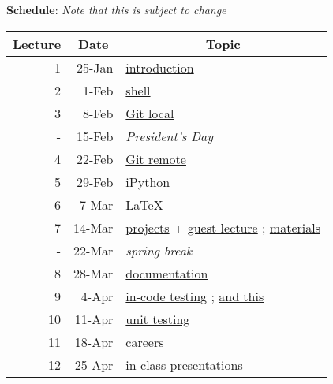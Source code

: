 \documentclass[12pt]{article}
\begin{document}
\clearpage
\noindent\textbf{Schedule}: \textit{Note that this is subject to change}\\
\begin{table}[htbp]
\begin{tabular}{|r|r|l|}
\hline
\multicolumn{1}{|c|}{Lecture} & \multicolumn{1}{c|}{Date} & \multicolumn{1}{c|}{Topic} \\ \hline
1 & 25-Jan & \href{http://rachelslaybaugh.github.io/ne24intro/#/}{introduction} \\ \hline
2 & 1-Feb & \href{https://github.com/rachelslaybaugh/shell-novice}{shell} \\ \hline
3 & 8-Feb & \href{https://github.com/rachelslaybaugh/git-novice}{Git local} \\ \hline
- & 15-Feb & \textit{President's Day} \\ \hline
4 & 22-Feb & \href{https://github.com/rachelslaybaugh/git-novice}{Git remote} \\ \hline
5 & 29-Feb & \href{https://githuhub.com/takluyver/ucb-ipython-intro.git}{iPython} \\ \hline
6 & 7-Mar & \href{https://github.com/rachelslaybaugh/NE24/tree/master/LaTeX}{\LaTeX} \\ \hline
7 & 14-Mar & \href{https://github.com/rachelslaybaugh/NE24/blob/master/project.md#presentation}{projects} + \href{http://thehackerwithin.github.io/berkeley/posts/numpy-vectorization/}{guest lecture} ; \href{https://github.com/thehackerwithin/berkeley/tree/master/python_logger}{materials}\\ \hline
- & 22-Mar & \textit{spring break} \\ \hline
8 & 28-Mar & \href{https://github.com/rachelslaybaugh/NE24/tree/master/documentation}{documentation} \\ \hline
9 & 4-Apr & \href{http://rachelslaybaugh.github.io/NE24/testing/Testing.pdf}{in-code testing} ; \href{http://rachelslaybaugh.github.io/NE24/testing/test-except.pdf}{and this} \\ \hline
10 & 11-Apr & \href{http://rachelslaybaugh.github.io/NE24/testing/Testing.pdf}{unit testing} \\ \hline
11 & 18-Apr & careers \\ \hline
12 & 25-Apr & in-class presentations \\ \hline
\end{tabular}
\end{table}
\end{document}
